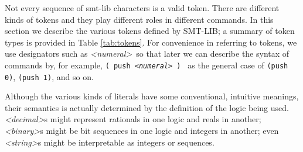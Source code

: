 \documentclass[12pt,oneside]{report}
\newcommand{\keyword}{{\it <keyword>}}
\newcommand{\ssym}{{\it <simple-symbol>}}
\newcommand{\qsym}{{\it <quoted-symbol>}}
\newcommand{\numeral}{{\it <numeral>}}
\newcommand{\decimal}{{\it <decimal>}}
\newcommand{\binary}{{\it <binary>}}
\newcommand{\strng}{{\it <string>}} %
\begin{document}
\begin{table}

\caption{Token types defined in SMT-LIB}
\label{tab:tokens}
\end{table}

Not every sequence of smt-lib characters is a valid token.  There are different kinds of tokens and they play different roles in different commands.  In this section we describe the various tokens defined by SMT-LIB; a summary of token types is provided in Table \ref{tab:tokens}.  For convenience in referring to tokens, we use designators such as \numeral~so that later we can describe the syntax of commands by, for example, {\tt ( push \numeral~) } as the general case of {\tt (push 0)}, {\tt (push 1)}, and so on.

Although the various kinds of literals have some conventional, intuitive meanings, their semantics is actually determined by
the definition of the logic being used.  \decimal s might represent rationals in one logic and reals in another; \binary s might
be bit sequences in one logic and integers in another; even \strng s might be interpretable as integers or sequences.
\end{document}
